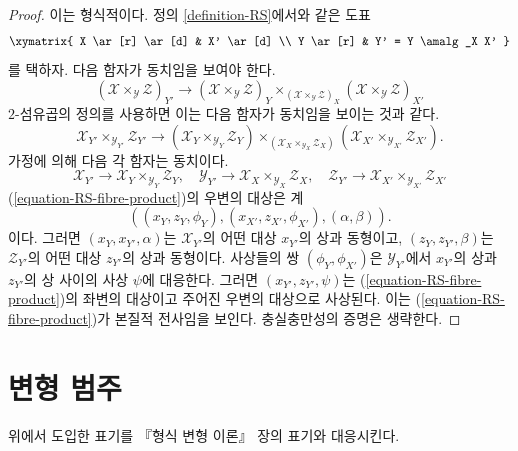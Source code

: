 \begin{proof}
이는 형식적이다. 정의 \ref{definition-RS}에서와 같은 도표
$$
\xymatrix{
X \ar[r] \ar[d] & X' \ar[d] \\
Y \ar[r] & Y' = Y \amalg_X X'
}
$$
를 택하자. 다음 함자가 동치임을 보여야 한다.
$$
(\mathcal{X} \times_{\mathcal{Y}} \mathcal{Z})_{Y'}
\longrightarrow
(\mathcal{X} \times_{\mathcal{Y}} \mathcal{Z})_Y
\times_{(\mathcal{X} \times_{\mathcal{Y}} \mathcal{Z})_X}
(\mathcal{X} \times_{\mathcal{Y}} \mathcal{Z})_{X'}
$$
$2$-섬유곱의 정의를 사용하면 이는 다음 함자가 동치임을 보이는 것과 같다.
\begin{equation}
\label{equation-RS-fibre-product}
\mathcal{X}_{Y'} \times_{\mathcal{Y}_{Y'}} \mathcal{Z}_{Y'}
\longrightarrow
(\mathcal{X}_Y \times_{\mathcal{Y}_Y} \mathcal{Z}_Y)
\times_{(\mathcal{X}_X \times_{\mathcal{Y}_X} \mathcal{Z}_X)}
(\mathcal{X}_{X'} \times_{\mathcal{Y}_{X'}} \mathcal{Z}_{X'}).
\end{equation}
가정에 의해 다음 각 함자는 동치이다.
$$
\mathcal{X}_{Y'} \to \mathcal{X}_Y \times_{\mathcal{Y}_Y} \mathcal{Z}_Y,
\quad
\mathcal{Y}_{Y'} \to \mathcal{X}_X \times_{\mathcal{Y}_X} \mathcal{Z}_X,
\quad
\mathcal{Z}_{Y'} \to
\mathcal{X}_{X'} \times_{\mathcal{Y}_{X'}} \mathcal{Z}_{X'}
$$
(\ref{equation-RS-fibre-product})의 우변의 대상은 계
$$
((x_Y, z_Y, \phi_Y), (x_{X'}, z_{X'}, \phi_{X'}), (\alpha, \beta)).
$$
이다. %
그러면 $(x_Y, x_{Y'}, \alpha)$는 $\mathcal{X}_{Y'}$의 어떤 대상
$x_{Y'}$의 상과 동형이고, $(z_Y, z_{Y'}, \beta)$는
$\mathcal{Z}_{Y'}$의 어떤 대상 $z_{Y'}$의 상과 동형이다. 사상들의 쌍
$(\phi_Y, \phi_{X'})$은 $\mathcal{Y}_{Y'}$에서 $x_{Y'}$의 상과
$z_{Y'}$의 상 사이의 사상 $\psi$에 대응한다. 그러면
$(x_{Y'}, z_{Y'}, \psi)$는 (\ref{equation-RS-fibre-product})의 좌변의
대상이고 주어진 우변의 대상으로 사상된다. 이는
(\ref{equation-RS-fibre-product})가 본질적 전사임을 보인다.
충실충만성의 증명은 생략한다.
\end{proof}





\section{변형 범주}
\label{section-deformation-categories}

\noindent
위에서 도입한 표기를 『형식 변형 이론』 장의 표기와 대응시킨다.

